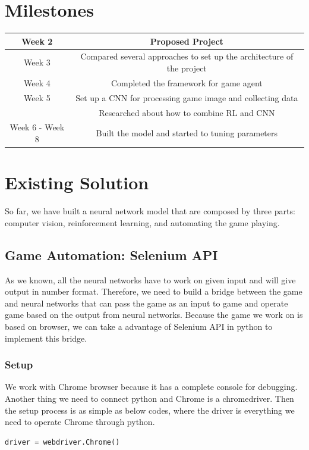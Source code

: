\documentclass{article}
\begin{document}
\section{Milestones}
\begin{center}
\begin{tabular}{ | c | c |} 
\hline
Week 2 & Proposed Project \\ 
\hline
Week 3 & Compared several approaches to set up the architecture of the project\\ 
\hline
Week 4 & Completed the framework for game agent\\ 
\hline
Week 5 & Set up a CNN for processing game image and collecting data\\ & Researched about how to combine RL and CNN \\ 
\hline
Week 6 - Week 8 & Built the model and started to tuning parameters \\ 
\hline
\end{tabular}
\end{center}

\section{Existing Solution}
So far, we have built a neural network model that are composed by three parts: computer vision, reinforcement learning, and automating the game playing. 

\subsection{Game Automation: Selenium API}
As we known, all the neural networks have to work on given input and will give output in number format. Therefore, we need to build a bridge between the game and neural networks that can pass the game as an input to game and operate game based on the output from neural networks. Because the game we work on is based on browser, we can take a advantage of Selenium API in python to implement this bridge. 

\subsubsection{Setup}
We work with Chrome browser because it has a complete console for debugging. Another thing we need to connect python and Chrome is a chromedriver. Then the setup process is as simple as below codes, where the driver is everything we need to operate Chrome through python.
\begin{lstlisting}[language=Python]
    driver = webdriver.Chrome()
\end{lstlisting}
\end{document}
